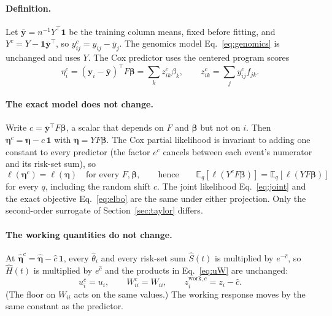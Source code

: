 \documentclass[11pt]{article}
\newcommand{\E}{\mathbb{E}_q}
\begin{document}
\paragraph{Definition.} Let $\bar{\bm y} = n^{-1}Y^\top\bm 1$ be the training
column means, fixed before fitting, and $Y^c = Y - \bm 1\bar{\bm y}^\top$, so
$y^c_{ij} = y_{ij} - \bar y_j$. The genomics model Eq.~\eqref{eq:genomics} is
unchanged and uses $Y$. The Cox predictor uses the centered program scores
\begin{equation}\label{eq:center-eta}
  \eta^c_i = (\bm y_i - \bar{\bm y})^\top F\bm\beta = \sum_k z^c_{ik}\beta_k,
  \qquad z^c_{ik} = \sum_j y^c_{ij} f_{jk}.
\end{equation}

\paragraph{The exact model does not change.} Write $c = \bar{\bm y}^\top F\bm\beta$,
a scalar that depends on $F$ and $\bm\beta$ but not on $i$. Then
$\bm\eta^c = \bm\eta - c\,\bm 1$ with $\bm\eta = YF\bm\beta$. The Cox partial
likelihood is invariant to adding one constant to every predictor (the factor
$e^{c}$ cancels between each event's numerator and its risk-set sum), so
\begin{equation}\label{eq:center-exact}
  \ell(\bm\eta^c) = \ell(\bm\eta)\quad\text{for every } F,\bm\beta,
  \qquad\text{hence}\qquad
  \E[\ell(Y^cF\bm\beta)] = \E[\ell(YF\bm\beta)]
\end{equation}
for every $q$, including the random shift $c$. The joint likelihood
Eq.~\eqref{eq:joint} and the exact objective Eq.~\eqref{eq:elbo} are the same
under either projection. Only the second-order surrogate of
Section~\ref{sec:taylor} differs.

\paragraph{The working quantities do not change.} At $\hat{\bm\eta}^c = \hat{\bm\eta} - \hat c\,\bm 1$,
every $\hat\theta_i$ and every risk-set sum $\hat S(t)$ is multiplied by
$e^{-\hat c}$, so $\hat H(t)$ is multiplied by $e^{\hat c}$ and the products in
Eq.~\eqref{eq:uW} are unchanged:
\begin{equation}\label{eq:center-uW}
  u^c_i = u_i, \qquad W^c_{ii} = W_{ii}, \qquad z^{\text{work},c}_i = z_i - \hat c .
\end{equation}
(The floor on $W_{ii}$ acts on the same values.) The working response moves by the
same constant as the predictor.
\end{document}
